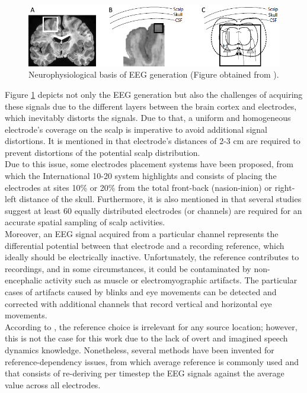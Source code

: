 \begin{figure}[h!]
	\centering
	\includegraphics[width=\linewidth]{Figures/EEG_Generation.png}
	\caption{Neurophysiological basis of EEG generation (Figure obtained from \cite{pizzagalli2007electroencephalography}).}
	\label{Fig: EEG_Generation}
\end{figure}

Figure \ref{Fig: EEG_Generation} depicts not only the EEG generation but also the challenges of acquiring these signals due to the different layers between the brain cortex and electrodes, which inevitably distorts the signals. Due to that, a uniform and homogeneous electrode's coverage on the scalp is imperative to avoid additional signal distortions. It is mentioned in \cite{pizzagalli2007electroencephalography} that electrode's distances of 2-3 cm are required to prevent distortions of the potential scalp distribution.\\

Due to this issue, some electrodes placement systems have been proposed, from which the International 10-20 system highlights and consists of placing the electrodes at sites 10\% or 20\% from the total front-back (nasion-inion) or right-left distance of the skull. Furthermore, it is also mentioned in \cite{pizzagalli2007electroencephalography} that several studies suggest at least 60 equally distributed electrodes (or channels) are required for an accurate spatial sampling of scalp activities.\\

Moreover, an EEG signal acquired from a particular channel represents the differential potential between that electrode and a recording reference, which ideally should be electrically inactive. Unfortunately, the reference contributes to recordings, and in some circumstances, it could be contaminated by non-encephalic activity such as muscle or electromyographic artifacts. The particular cases of artifacts caused by blinks and eye movements can be detected and corrected with additional channels that record vertical and horizontal eye movements.\\

According to \cite{pizzagalli2007electroencephalography}, the reference choice is irrelevant for any source location; however, this is not the case for this work due to the lack of overt and imagined speech dynamics knowledge. Nonetheless, several methods have been invented for reference-dependency issues, from which average reference is commonly used and that consists of re-deriving per timestep the EEG signals against the average value across all electrodes.\\

